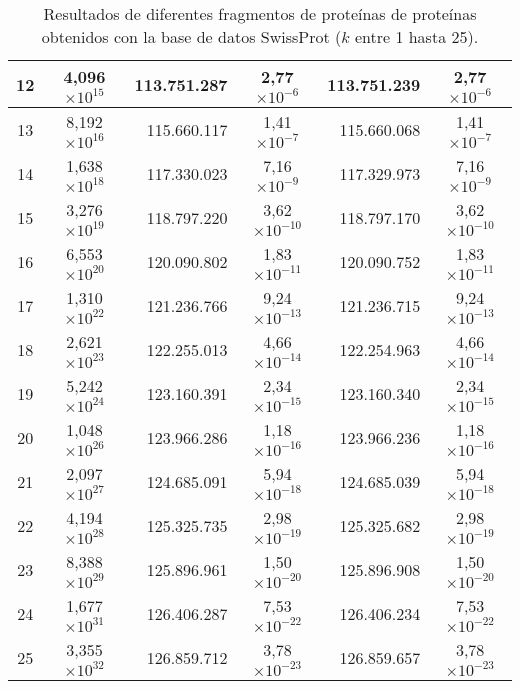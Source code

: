\begin{table}[!hbt]
\begin{tabular}{| c  r  r  c  r  c |}
    12 & \multicolumn{1}{c}{4,096$\times 10^{15}$} & 113.751.287 & 2,77$\times 10^{-6}$ & 113.751.239 & 2,77$\times 10^{-6}$ \\ \hline  
    13 & \multicolumn{1}{c}{8,192$\times 10^{16}$} & 115.660.117 & 1,41$\times 10^{-7}$ & 115.660.068 & 1,41$\times 10^{-7}$ \\ \hline
    14 & \multicolumn{1}{c}{1,638$\times 10^{18}$} & 117.330.023 & 7,16$\times 10^{-9}$ & 117.329.973 & 7,16$\times 10^{-9}$ \\ \hline  
    15 & \multicolumn{1}{c}{3,276$\times 10^{19}$} & 118.797.220 & 3,62$\times 10^{-10}$ & 118.797.170 & 3,62$\times 10^{-10}$ \\ \hline
    16 & \multicolumn{1}{c}{6,553$\times 10^{20}$} & 120.090.802 & 1,83$\times 10^{-11}$ & 120.090.752 & 1,83$\times 10^{-11}$ \\ \hline  
    17 & \multicolumn{1}{c}{1,310$\times 10^{22}$} & 121.236.766 & 9,24$\times 10^{-13}$ & 121.236.715 & 9,24$\times 10^{-13}$ \\ \hline
    18 & \multicolumn{1}{c}{2,621$\times 10^{23}$} & 122.255.013 & 4,66$\times 10^{-14}$ & 122.254.963 & 4,66$\times 10^{-14}$ \\ \hline  
    19 & \multicolumn{1}{c}{5,242$\times 10^{24}$} & 123.160.391 & 2,34$\times 10^{-15}$ & 123.160.340 & 2,34$\times 10^{-15}$ \\ \hline
    20 & \multicolumn{1}{c}{1,048$\times 10^{26}$} & 123.966.286 & 1,18$\times 10^{-16}$ & 123.966.236 & 1,18$\times 10^{-16}$ \\ \hline  
    21 & \multicolumn{1}{c}{2,097$\times 10^{27}$} & 124.685.091 & 5,94$\times 10^{-18}$ & 124.685.039 & 5,94$\times 10^{-18}$ \\ \hline
    22 & \multicolumn{1}{c}{4,194$\times 10^{28}$} & 125.325.735 & 2,98$\times 10^{-19}$ & 125.325.682 & 2,98$\times 10^{-19}$ \\ \hline  
    23 & \multicolumn{1}{c}{8,388$\times 10^{29}$} & 125.896.961 & 1,50$\times 10^{-20}$ & 125.896.908 & 1,50$\times 10^{-20}$ \\ \hline
    24 & \multicolumn{1}{c}{1,677$\times 10^{31}$} & 126.406.287 & 7,53$\times 10^{-22}$ & 126.406.234 & 7,53$\times 10^{-22}$ \\ \hline  
    25 & \multicolumn{1}{c}{3,355$\times 10^{32}$} & 126.859.712 & 3,78$\times 10^{-23}$ & 126.859.657 & 3,78$\times 10^{-23}$ \\ \hline        
    \end{tabular}
    \caption{Resultados de diferentes fragmentos de proteínas de proteínas obtenidos con la base de datos SwissProt ($k$ entre 1 hasta 25).}
    \label{tb:labela11}
\end{table}

